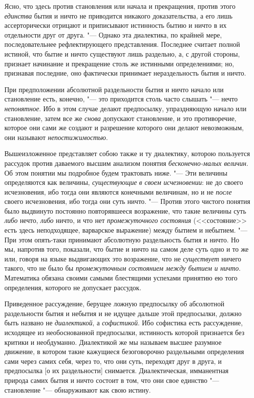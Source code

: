Ясно, что здесь против становления или начала и прекращения, против этого
{\em единства} бытия и ничто не приводится никакого
доказательства, а его лишь ассерторически отрицают и приписывают истинность
бытию и ничто в их отдельности друг от друга. "--- Однако эта диалектика,
по крайней мере, последовательнее рефлектирующего представления. Последнее
считает полной истиной, что бытие и ничто существуют лишь раздельно, а, с
другой стороны, признает начинание и прекращение столь же истинными
определениями; но, признавая последние, оно фактически принимает
нераздельность бытия и ничто.

При предположении абсолютной раздельности бытия и ничто начало или
становление есть, конечно, "--- это приходится столь часто слышать "--- нечто
{\em непонятное}. Ибо в этом случае делают предпосылку,
упраздняющую начало или становление, затем все же
{\em снова} допускают становление, и это противоречие,
которое они сами же создают и разрешение которого они делают невозможным,
они называют {\em непостижимостью}.

Вышеизложенное представляет собою также и ту диалектику, которою пользуется
рассудок против даваемого высшим анализом понятия
{\em бесконечно-малых величин}. Об этом понятии мы
подробное будем трактовать ниже. "--- Эти величины определяются как величины,
{\em существующие} {\em в своем
исчезновении}: не до своего исчезновения, ибо тогда они являются конечными
величинам, но и не {\em после} своего исчезновения, ибо
тогда они суть ничто. "--- Против этого чистого понятия было выдвинуто
постоянно повторявшееся возражение, что такие величины суть
{\em либо} нечто, {\em либо} ничто,
и что нет {\em промежуточного состояния} (<<состояние>>
есть здесь неподходящее, варварское выражение) между бытием и небытием. "---
При этом опять-таки принимают абсолютную раздельность бытия и ничто. Но мы,
напротив того, показали, что бытие и ничто на самом деле суть одно и то же
или, говоря на языке выдвигающих это возражение, что не
{\em существует} ничего такого, что не было бы
{\em промежуточным состоянием между бытием и ничто}.
Математика обязана своими самыми блестящими успехами принятию ею того
определения, которого не допускает рассудок.

Приведенное рассуждение, берущее ложную предпосылку об абсолютной
раздельности бытия и небытия и не идущее дальше этой предпосылки, должно
быть названо не {\em диалектикой}, а
{\em софистикой}. Ибо софистика есть рассуждение,
исходящее из необоснованной предпосылки, истинность которой признается без
критики и необдуманно. Диалектикой же мы называем высшее разумное движение,
в котором такие кажущиеся безоговорочно раздельными определения сами через
самих себя, через то, что они суть, переходят друг в друга, и предпосылка
[о их раздельности] снимается. Диалектическая, имманентная природа самих
бытия и ничто состоит в том, что они свое единство "--- становление
"--- обнаруживают как свою истину.

